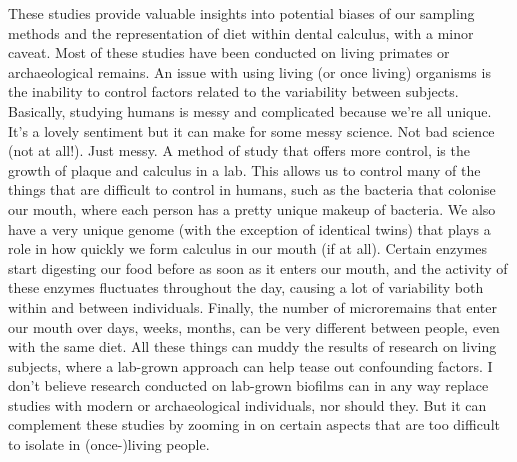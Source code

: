 \documentclass[
  letterpaper,
]{book}
\begin{document}
These studies provide valuable insights into potential biases of our
sampling methods and the representation of diet within dental calculus,
with a minor caveat. Most of these studies have been conducted on living
primates or archaeological remains. An issue with using living (or once
living) organisms is the inability to control factors related to the
variability between subjects. Basically, studying humans is messy and
complicated because we're all unique. It's a lovely sentiment but it can
make for some messy science. Not bad science (not at all!). Just messy.
A method of study that offers more control, is the growth of plaque and
calculus in a lab. This allows us to control many of the things that are
difficult to control in humans, such as the bacteria that colonise our
mouth, where each person has a pretty unique makeup of bacteria. We also
have a very unique genome (with the exception of identical twins) that
plays a role in how quickly we form calculus in our mouth (if at all).
Certain enzymes start digesting our food before as soon as it enters our
mouth, and the activity of these enzymes fluctuates throughout the day,
causing a lot of variability both within and between individuals.
Finally, the number of microremains that enter our mouth over days,
weeks, months, can be very different between people, even with the same
diet. All these things can muddy the results of research on living
subjects, where a lab-grown approach can help tease out confounding
factors. I don't believe research conducted on lab-grown biofilms can in
any way replace studies with modern or archaeological individuals, nor
should they. But it can complement these studies by zooming in on
certain aspects that are too difficult to isolate in (once-)living
people.
\end{document}
